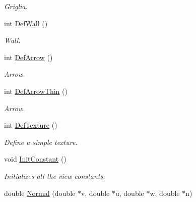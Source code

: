 \begin{DoxyCompactItemize}
\begin{DoxyCompactList}\small\item\em \-Griglia. \end{DoxyCompactList}\item 
\hypertarget{classDraw_a9e8807139062d3d8e7a5ae14e98480da}{int \hyperlink{classDraw_a9e8807139062d3d8e7a5ae14e98480da}{\-Def\-Wall} ()}\label{classDraw_a9e8807139062d3d8e7a5ae14e98480da}

\begin{DoxyCompactList}\small\item\em \-Wall. \end{DoxyCompactList}\item 
\hypertarget{classDraw_aa63c0ecef2860e57c23d6ff1e631189b}{int \hyperlink{classDraw_aa63c0ecef2860e57c23d6ff1e631189b}{\-Def\-Arrow} ()}\label{classDraw_aa63c0ecef2860e57c23d6ff1e631189b}

\begin{DoxyCompactList}\small\item\em \-Arrow. \end{DoxyCompactList}\item 
\hypertarget{classDraw_a19a76422b4564ec10df73ec0256f2974}{int \hyperlink{classDraw_a19a76422b4564ec10df73ec0256f2974}{\-Def\-Arrow\-Thin} ()}\label{classDraw_a19a76422b4564ec10df73ec0256f2974}

\begin{DoxyCompactList}\small\item\em \-Arrow. \end{DoxyCompactList}\item 
\hypertarget{classDraw_a5fd96ad8c1ebeede7341bcf3a20aa65d}{int \hyperlink{classDraw_a5fd96ad8c1ebeede7341bcf3a20aa65d}{\-Def\-Texture} ()}\label{classDraw_a5fd96ad8c1ebeede7341bcf3a20aa65d}

\begin{DoxyCompactList}\small\item\em \-Define a simple texture. \end{DoxyCompactList}\item 
\hypertarget{classDraw_ac0790850f6751e5fe0f47d16d7f67255}{void \hyperlink{classDraw_ac0790850f6751e5fe0f47d16d7f67255}{\-Init\-Constant} ()}\label{classDraw_ac0790850f6751e5fe0f47d16d7f67255}

\begin{DoxyCompactList}\small\item\em \-Initializes all the view constants. \end{DoxyCompactList}\item 
\hypertarget{classDraw_a16f350a8340f724d1b358e89fe18c340}{double \hyperlink{classDraw_a16f350a8340f724d1b358e89fe18c340}{\-Normal} (double $\ast$v, double $\ast$u, double $\ast$w, double $\ast$n)}\label{classDraw_a16f350a8340f724d1b358e89fe18c340}


\end{DoxyCompactItemize}
